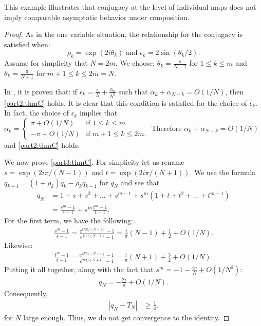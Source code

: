 \documentclass{amsart}
\theoremstyle{remark}
\theoremstyle{definition}
\newcommand{\lp}{\left(}
\newcommand{\rp}{\right)}
\begin{document}
This example illustrates that conjugacy at the level of individual maps does not imply comparable asymptotic behavior under composition.

\begin{proof}
As in the one variable situation, the relationship for the conjugacy is satisfied when:
\[
\rho_k=\exp(2i\theta_k)\textrm{ and }\epsilon_k = 2\sin(\theta_k/2).
\]
Assume for simplicity that $N=2m$. We choose: $\theta_k= \frac{\pi}{N-1}$ for $1\leq k \leq m $ and $\theta_k= \frac{\pi}{N+1}$ for $m+1 \leq k\leq 2m=N$.

In \cite{Viv20}, it is proven that: if $\epsilon_k = \frac{\pi}{N} + \frac{\alpha_k}{N^2}$ such that $\alpha_k + \alpha_{N-k} = O\lp 1/N\rp$, then \eqref{part2:thmC} holds. It is clear that this condition is satisfied for the choice of $\epsilon_k$.
In fact, the choice of $\epsilon_k$ implies that
$\alpha_k= 
\begin{cases}
  \pi + O(1/N) & \text{if $1\leq k \leq m$} \\
  -\pi + O(1/N) & \text{if $m+1\leq k \leq 2m.$}
\end{cases}
$
Therefore $\alpha_k+\alpha_{N-k} = O(1/N)$ and \eqref{part2:thmC} holds.

We now prove \eqref{part3:thmC}. For simplicity let us rename $s=\exp(2i\pi/(N-1))$ and $t=\exp(2i\pi/(N+1))$. We use the formula $q_{k+1}=(1+\rho_k)q_k -\rho_kq_{k-1}$ for $q_N$ and see that
        \begin{align*}
			q_N&= 1+s+s^2+\ldots+s^{m-1}+s^m\left(1+t+t^2+\ldots +t^{m-1}\right)\\
			&= \frac{s^m-1}{s-1}+ s^m\frac{t^m-1}{t-1}.
		\end{align*}
	For the first term, we have the following:
    \begin{align*}
    \frac{s^m-1}{s-1}=\frac{e^{iN\pi/(N-1)}-1}{e^{2i\pi/(N-1)}-1} = \frac{i}{\pi}(N-1) + \frac{1}{2} + O(1/N).
	\end{align*}
    Likewise:
    \begin{align*}
    \frac{t^m-1}{t-1}=\frac{e^{iN\pi/(N+1)}-1}{e^{2i\pi/(N+1)}-1} =\frac{i}{\pi}(N+1) +\frac{3}{2} + O(1/N).
	\end{align*}
    Putting it all together, along with the fact that $s^m = -1 - \frac{i\pi}{N}+O(1/N^2)$:
    \begin{align*}
    q_N =  -\frac{2i}{\pi} + O(1/N).
	\end{align*}
	Consequently,	
	\begin{align*}
		|q_N-T_N| &\geq \frac{1}{\pi}.
	\end{align*}
    for $N$ large enough.
	Thus, we do not get convergence to the identity.
\end{proof}
\end{document}
